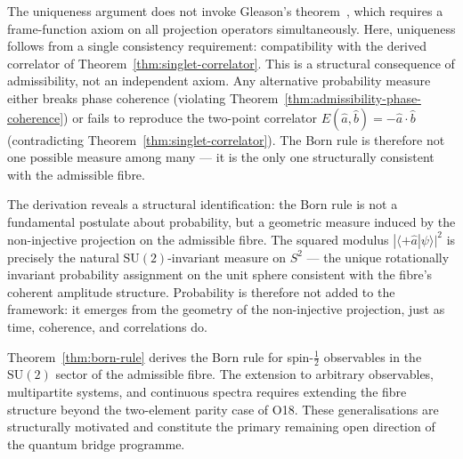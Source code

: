 \begin{remark}
  \label{rem:no-gleason}
  The uniqueness argument does not invoke Gleason's theorem~\cite{Gleason1957}, which requires
  a frame-function axiom on all projection operators simultaneously.
  Here, uniqueness follows from a single consistency requirement:
  compatibility with the derived correlator of
  Theorem~\ref{thm:singlet-correlator}.
  This is a structural consequence of admissibility, not an independent
  axiom.
  Any alternative probability measure either breaks phase coherence
  (violating Theorem~\ref{thm:admissibility-phase-coherence}) or fails to
  reproduce the two-point correlator $E(\hat{a},\hat{b}) = -\hat{a}\cdot\hat{b}$
  (contradicting Theorem~\ref{thm:singlet-correlator}).
  The Born rule is therefore not one possible measure among many — it is the
  only one structurally consistent with the admissible fibre.
\end{remark}

\begin{remark}
  \label{rem:born-geometry}
  The derivation reveals a structural identification: the Born rule is not
  a fundamental postulate about probability, but a geometric measure induced
  by the non-injective projection on the admissible fibre.
  The squared modulus $|\langle+\hat{a}|\psi\rangle|^2$ is precisely the
  natural $\mathrm{SU}(2)$-invariant measure on $S^2$ — the unique
  rotationally invariant probability assignment on the unit sphere
  consistent with the fibre's coherent amplitude structure.
  Probability is therefore not added to the framework: it emerges from the
  geometry of the non-injective projection, just as time, coherence, and
  correlations do.
\end{remark}

\begin{remark}
  \label{rem:born-status}
  Theorem~\ref{thm:born-rule} derives the Born rule for spin-$\tfrac{1}{2}$
  observables in the $\mathrm{SU}(2)$ sector of the admissible fibre.
  The extension to arbitrary observables, multipartite systems, and
  continuous spectra requires extending the fibre structure beyond the
  two-element parity case of O18.
  These generalisations are structurally motivated and constitute the
  primary remaining open direction of the quantum bridge programme.
\end{remark}
